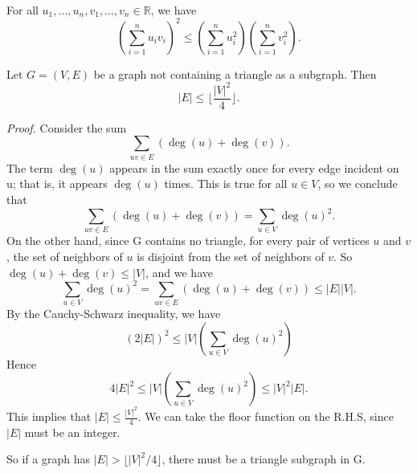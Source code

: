 \documentclass{tufte-handout}
\begin{document}
\begin{Theorem} \hfill\\
    For all \( u_1, \ldots, u_n, v_1, \ldots, v_n \in \mathbb{R} \), we have\[\left(\sum_{i=1}^{n} u_i v_i\right)^2 \leq \left(\sum_{i=1}^{n} u_i^2\right)\left(\sum_{i=1}^{n} v_i^2\right).\]
\end{Theorem}

\begin{Theorem}
    Let \( G = (V,E) \) be a graph not containing a triangle as a subgraph. Then
    \[ \left|E\right| \leq \lfloor \frac{\left|V\right|^2}{4} \rfloor.\]
\end{Theorem}

\textit{Proof.} Consider the sum \[ \sum_{uv\in E}\left(\deg(u)+\deg(v)\right).\]
The term \( \deg(u) \) appears in the sum exactly once for every edge incident on u; that is, it
appears \( \deg(u) \) times. This is true for all \( u \in V \), so we conclude that
\[ \sum_{uv\in E}\left(\deg(u)+\deg(v)\right) = \sum_{u\in V}\deg(u)^2.\]
On the other hand, since G contains no triangle, for every pair of vertices \( u\) and \( v \), the set
of neighbors of \( u \) is disjoint from the set of neighbors of \( v \). So \( \deg(u) +\deg(v) \leq \left|V\right| \), and we have
\[ \sum_{u\in V}\deg(u)^2=\sum_{uv\in E}\left(\deg(u)+\deg(v)\right) \leq \left|E\right|\left|V\right|.\]
By the Cauchy-Schwarz inequality, we have
\[(2\left|E\right|)^2\leq \left|V\right|\left(\sum_{u\in V}\deg(u)^2\right)\]
Hence \[4\left|E\right|^2\leq\left|V\right|\left(\sum_{u\in V}\deg(u)^2\right)\leq \left|V\right|^2\left|E\right|.\]
This implies that \( \left|E\right|\leq \frac{\left|V\right|^2}{4} \).
We can take the floor function on the R.H.S, since \( \left|E\right| \) must be an integer.\qedsymbol

So if a graph has \(\left|E\right| > \lfloor \left|V\right|^2\slash 4 \rfloor \), there must be a triangle subgraph in G.
\end{document}
